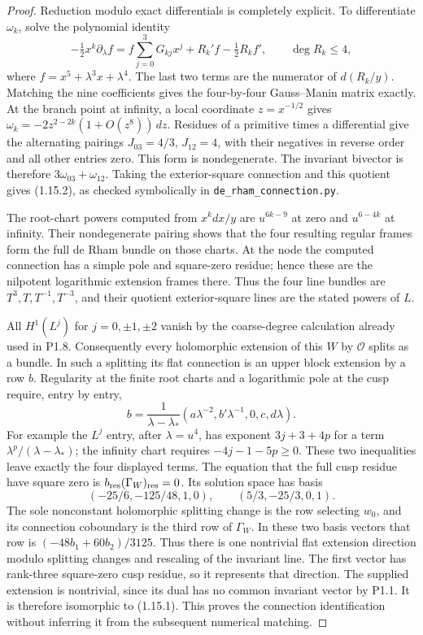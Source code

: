\begin{proof}
Reduction modulo exact differentials is completely explicit.  To
differentiate $\omega_k$, solve the polynomial identity
\[
-\tfrac12x^k\partial_\lambda f
 =f\sum_{j=0}^3G_{kj}x^j+R_k'f-\tfrac12R_kf',
 \qquad\deg R_k\leq4,
\]
where $f=x^5+\lambda^3x+\lambda^4$.  The last two terms are the
numerator of $d(R_k/y)$.  Matching the nine coefficients gives the
four-by-four Gauss--Manin matrix exactly.
At the branch point at infinity, a local coordinate $z=x^{-1/2}$
gives $\omega_k=-2z^{2-2k}(1+O(z^8))\,dz$.
Residues of a primitive times a differential give the alternating
pairings $J_{03}=4/3$, $J_{12}=4$, with their negatives in reverse
order and all other entries zero.  This form is nondegenerate.
The invariant bivector is therefore $3\omega_{03}+\omega_{12}$.
Taking the exterior-square connection and this quotient gives
(1.15.2), as checked symbolically in \texttt{de\_rham\_connection.py}.

The root-chart powers computed from $x^kdx/y$ are
$u^{6k-9}$ at zero and $u^{6-4k}$ at infinity.
Their nondegenerate pairing shows that the four resulting regular
frames form the full de Rham bundle on those charts.  At the node
the computed connection has a simple pole and square-zero residue;
hence these are the nilpotent logarithmic extension frames there.
Thus the four line bundles are
$T^3,T,T^{-1},T^{-3}$, and their quotient exterior-square lines are
the stated powers of $L$.

All $H^1(L^j)$ for $j=0,\pm1,\pm2$ vanish by the coarse-degree
calculation already used in P1.8.  Consequently every holomorphic
extension of this $W$ by $\mathcal O$ splits as a bundle.
In such a splitting its flat connection is an upper block extension
by a row $b$.  Regularity at the finite root charts and a logarithmic
pole at the cusp require, entry by entry,
\[
b=\frac1{\lambda-\lambda_*}
 (a\lambda^{-2},b'\lambda^{-1},0,c,d\lambda).
\]
For example the $L^j$ entry, after $\lambda=u^4$, has exponent
$3j+3+4p$ for a term $\lambda^p/ (\lambda-\lambda_*)$;
the infinity chart requires $-4j-1-5p\geq0$.
These two inequalities leave exactly the four displayed terms.
The equation that the full cusp residue have square zero is
$b_{\rm res}(\Gamma_W)_{\rm res}=0$.
Its solution space has basis
\[
(-25/6,-125/48,1,0),\qquad(5/3,-25/3,0,1).
\]
The sole nonconstant holomorphic splitting change is the row selecting
$w_0$, and its connection coboundary is the third row of $\Gamma_W$.
In these two basis vectors that row is $(-48b_1+60b_2)/3125$.
Thus there is one nontrivial flat extension direction modulo splitting
changes and rescaling of the invariant line.  The first vector has
rank-three square-zero cusp residue, so it represents that direction.
The supplied extension is nontrivial, since its dual has no common
invariant vector by P1.1.  It is therefore isomorphic to (1.15.1).
This proves the connection identification without inferring it from
the subsequent numerical matching.


\end{proof}
